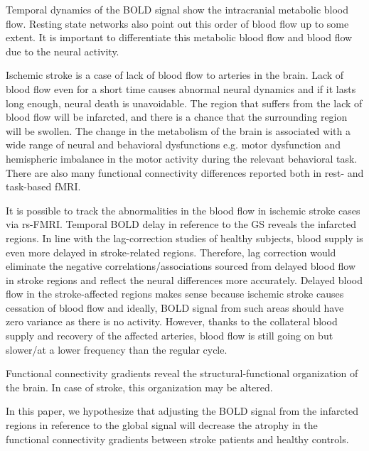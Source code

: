 \documentclass[fleqn,10pt]{wlscirep}
\begin{document}
Temporal dynamics of the BOLD signal show the intracranial metabolic blood flow. Resting state networks also point out this order of blood flow up to some extent. It is important to differentiate this metabolic blood flow and blood flow due to the neural activity. 

Ischemic stroke is a case of lack of blood flow to arteries in the brain. Lack of blood flow even for a short time causes abnormal neural dynamics and if it lasts long enough, neural death is unavoidable. The region that suffers from the lack of blood flow will be infarcted, and there is a chance that the surrounding region will be swollen. The change in the metabolism of the brain is associated with a wide range of neural and behavioral dysfunctions e.g. motor dysfunction and hemispheric imbalance in the motor activity during the relevant behavioral task. There are also many functional connectivity differences reported both in rest- and task-based fMRI.


It is possible to track the abnormalities in the blood flow in ischemic stroke cases via rs-FMRI. Temporal BOLD delay in reference to the GS reveals the infarcted regions. In line with the lag-correction studies of healthy subjects, blood supply is even more delayed in stroke-related regions. Therefore, lag correction would eliminate the negative correlations/associations sourced from delayed blood flow in stroke regions and reflect the neural differences more accurately. Delayed blood flow in the stroke-affected regions makes sense because ischemic stroke causes cessation of blood flow and ideally, BOLD signal from such areas should have zero variance as there is no activity. However, thanks to the collateral blood supply and recovery of the affected arteries, blood flow is still going on but slower/at a lower frequency than the regular cycle. 

Functional connectivity gradients reveal the structural-functional organization of the brain. In case of stroke, this organization may be altered. 

In this paper, we hypothesize that adjusting the BOLD signal from the infarcted regions in reference to the global signal will decrease the atrophy in the functional connectivity gradients between stroke patients and healthy controls.
\end{document}
